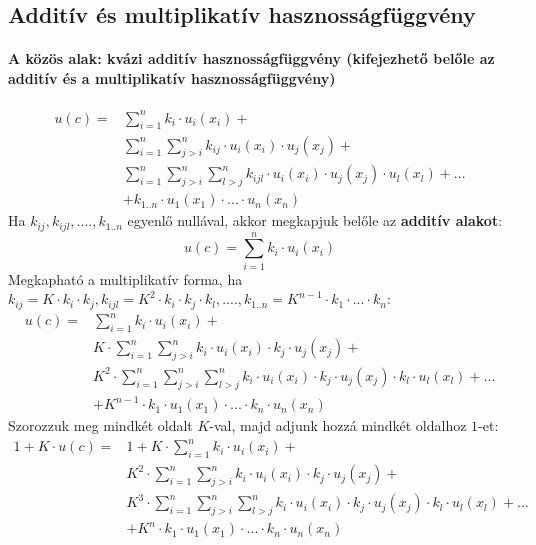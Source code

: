 \documentclass[a4paper,12pt]{article}
\begin{document}
\subsection{Additív és multiplikatív hasznosságfüggvény}
\paragraph{A közös alak: kvázi additív hasznosságfüggvény (kifejezhető belőle az additív és a multiplikatív hasznosságfüggvény)}
\begin{equation}
\begin{split}
u(c) = & \sum_{i=1}^n k_i\cdot u_i(x_i)+ \\
&\sum_{i=1}^n \sum_{j>i}^n k_{ij}\cdot u_i(x_i)\cdot u_j(x_j) + \\
&\sum_{i=1}^n \sum_{j>i}^n \sum_{l>j}^n k_{ijl}\cdot u_i(x_i)\cdot u_j(x_j)\cdot u_l(x_l) + ... \\ 
&+k_{1..n}\cdot u_1(x_1)\cdot  ... \cdot  u_n(x_n)
\end{split}
\end{equation}
Ha $k_{ij}, k_{ijl}, ...., k_{1..n}$ egyenlő nullával, akkor megkapjuk belőle az \textbf{additív alakot}:
\begin{equation}
u(c) =  \sum_{i=1}^n k_i\cdot u_i(x_i)
\end{equation}
Megkapható a multiplikatív forma, ha $k_{ij} = K\cdot k_i\cdot k_j, k_{ijl} = K^2\cdot k_i\cdot k_j\cdot k_l, ...., k_{1..n} = K^{n-1}\cdot k_1\cdot ...\cdot k_n$:
\begin{equation}
\label{multiq}
\begin{split}
u(c) = & \sum_{i=1}^n k_i\cdot u_i(x_i)+ \\
&K\cdot \sum_{i=1}^n \sum_{j>i}^n k_{i}\cdot u_i(x_i)\cdot k_{j}\cdot u_j(x_j) + \\
&K^2\cdot \sum_{i=1}^n \sum_{j>i}^n \sum_{l>j}^n k_{i}\cdot u_i(x_i)\cdot k_{j}\cdot u_j(x_j)\cdot k_{l}\cdot u_l(x_l) + ... \\ 
&+K^{n-1}\cdot k_{1}\cdot u_1(x_1)\cdot  ... \cdot  k_{n} \cdot  u_n(x_n)
\end{split}
\end{equation}
Szorozzuk meg mindkét oldalt $K$-val, majd adjunk hozzá mindkét oldalhoz $1$-et:
\begin{equation}
\begin{split}
1 + K\cdot u(c) = & 1 + K\cdot \sum_{i=1}^n k_i\cdot u_i(x_i)+ \\
&K^2\cdot \sum_{i=1}^n \sum_{j>i}^n k_{i}\cdot u_i(x_i)\cdot k_{j}\cdot u_j(x_j) + \\
&K^3\cdot \sum_{i=1}^n \sum_{j>i}^n \sum_{l>j}^n k_{i}\cdot u_i(x_i)\cdot k_{j}\cdot u_j(x_j)\cdot k_{l}\cdot u_l(x_l) + ... \\ 
&+K^{n}\cdot k_{1}\cdot u_1(x_1)\cdot  ... \cdot  k_{n} \cdot  u_n(x_n)
\end{split}
\end{equation}
\end{document}
